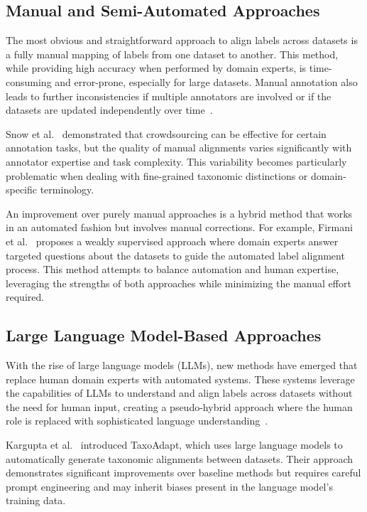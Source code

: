 \subsection{Manual and Semi-Automated Approaches}

The most obvious and straightforward approach to align labels across datasets is a fully
manual mapping of labels from one dataset to another. This method, while providing high
accuracy when performed by domain experts, is time-consuming and error-prone, especially
for large datasets. Manual annotation also leads to further inconsistencies if multiple
annotators are involved or if the datasets are updated independently over
time~\cite{bordea_semeval-2016_2016,jurgens_semeval-2016_2016,yang_literature-driven_2013}.

Snow et al.~\cite{snow_cheap_2008} demonstrated that crowdsourcing can be effective for
certain annotation tasks, but the quality of manual alignments varies significantly with
annotator expertise and task complexity. This variability becomes particularly
problematic when dealing with fine-grained taxonomic distinctions or domain-specific
terminology.

An improvement over purely manual approaches is a hybrid method that works in an
automated fashion but involves manual corrections. For example, Firmani et
al.~\cite{firmani_building_2024} proposes a weakly supervised approach where domain
experts answer targeted questions about the datasets to guide the automated label
alignment process. This method attempts to balance automation and human expertise,
leveraging the strengths of both approaches while minimizing the manual effort required.

\subsection{Large Language Model-Based Approaches}

With the rise of large language models (LLMs), new methods have emerged that replace
human domain experts with automated systems. These systems leverage the capabilities of
LLMs to understand and align labels across datasets without the need for human input,
creating a pseudo-hybrid approach where the human role is replaced with sophisticated
language understanding~\cite{kargupta_taxoadapt_2025,chen_prompting_2023,gunn_creating_2024}.

Kargupta et al.~\cite{kargupta_taxoadapt_2025} introduced TaxoAdapt, which uses large
language models to automatically generate taxonomic alignments between datasets. Their
approach demonstrates significant improvements over baseline methods but requires careful
prompt engineering and may inherit biases present in the language model's training data.

